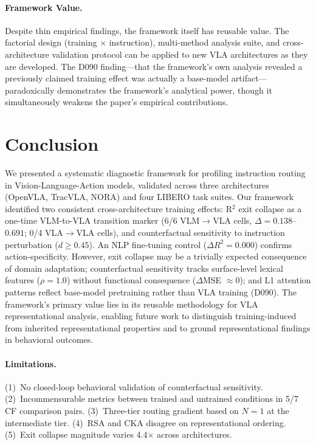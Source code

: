 \documentclass[letterpaper]{article}
\begin{document}
\paragraph{Framework Value.}
Despite thin empirical findings, the framework itself has reusable value. The factorial design (training $\times$ instruction), multi-method analysis suite, and cross-architecture validation protocol can be applied to new VLA architectures as they are developed. The D090 finding---that the framework's own analysis revealed a previously claimed training effect was actually a base-model artifact---paradoxically demonstrates the framework's analytical power, though it simultaneously weakens the paper's empirical contributions.

\section{Conclusion}

We presented a systematic diagnostic framework for profiling instruction routing in Vision-Language-Action models, validated across three architectures (OpenVLA, TracVLA, NORA) and four LIBERO task suites. Our framework identified two consistent cross-architecture training effects: R$^2$ exit collapse as a one-time VLM-to-VLA transition marker (6/6 VLM$\to$VLA cells, $\Delta = 0.138$--$0.691$; 0/4 VLA$\to$VLA cells), and counterfactual sensitivity to instruction perturbation ($d \geq 0.45$). An NLP fine-tuning control ($\Delta R^2 = 0.000$) confirms action-specificity. However, exit collapse may be a trivially expected consequence of domain adaptation; counterfactual sensitivity tracks surface-level lexical features ($\rho = 1.0$) without functional consequence ($\Delta$MSE $\approx 0$); and L1 attention patterns reflect base-model pretraining rather than VLA training (D090). The framework's primary value lies in its reusable methodology for VLA representational analysis, enabling future work to distinguish training-induced from inherited representational properties and to ground representational findings in behavioral outcomes.

\paragraph{Limitations.}
(1)~No closed-loop behavioral validation of counterfactual sensitivity. (2)~Incommensurable metrics between trained and untrained conditions in 5/7 CF comparison pairs. (3)~Three-tier routing gradient based on $N=1$ at the intermediate tier. (4)~RSA and CKA disagree on representational ordering. (5)~Exit collapse magnitude varies 4.4$\times$ across architectures.



\end{document}
